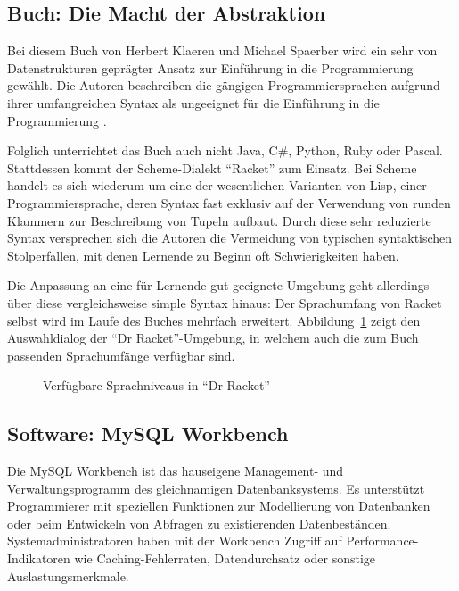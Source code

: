 \subsection{Buch: Die Macht der Abstraktion}

Bei diesem Buch von Herbert Klaeren und Michael Spaerber wird ein sehr von Datenstrukturen geprägter Ansatz zur Einführung in die Programmierung gewählt. Die Autoren beschreiben die gängigen Programmiersprachen aufgrund ihrer umfangreichen Syntax als ungeeignet für die Einführung in die Programmierung \cite[2]{macht-der-abstraktion}. 

Folglich unterrichtet das Buch auch nicht Java, C\#, Python, Ruby oder Pascal. Stattdessen kommt der Scheme-Dialekt "`Racket"' zum Einsatz. Bei Scheme handelt es sich wiederum um eine der wesentlichen Varianten von Lisp, einer Programmiersprache, deren Syntax fast exklusiv auf der Verwendung von runden Klammern zur Beschreibung von Tupeln aufbaut. Durch diese sehr reduzierte Syntax versprechen sich die Autoren die Vermeidung von typischen syntaktischen Stolperfallen, mit denen Lernende zu Beginn oft Schwierigkeiten haben.

Die Anpassung an eine für Lernende gut geeignete Umgebung geht allerdings über diese vergleichsweise simple Syntax hinaus: Der Sprachumfang von Racket selbst wird im Laufe des Buches mehrfach erweitert. Abbildung~\ref{fig:drracket-language-levels} zeigt den Auswahldialog der "`Dr Racket"'-Umgebung, in welchem auch die zum Buch passenden Sprachumfänge verfügbar sind.

\begin{figure}[h]
  \centering {}
  \caption{Verfügbare Sprachniveaus in "`Dr Racket"'}
  \label{fig:drracket-language-levels}
\end{figure}

\subsection{Software: MySQL Workbench}

Die MySQL Workbench ist das hauseigene Management- und Verwaltungsprogramm des gleichnamigen Datenbanksystems. Es unterstützt Programmierer mit speziellen Funktionen zur Modellierung von Datenbanken oder beim Entwickeln von Abfragen zu existierenden Datenbeständen. Systemadministratoren haben mit der Workbench Zugriff auf Performance-Indikatoren wie Caching-Fehlerraten, Datendurchsatz oder sonstige Auslastungsmerkmale.


